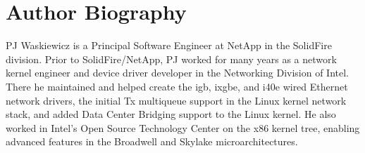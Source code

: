 \documentclass[letterpaper]{article}
\begin{document}
\section{Author Biography}
PJ Waskiewicz is a Principal Software Engineer at NetApp in the SolidFire division. Prior to SolidFire/NetApp, PJ worked for many years as a network kernel engineer and device driver developer in the Networking Division of Intel. There he maintained and helped create the igb, ixgbe, and i40e wired Ethernet network drivers, the initial Tx multiqueue support in the Linux kernel network stack, and added Data Center Bridging support to the Linux kernel. He also worked in Intel's Open Source Technology Center on the x86 kernel tree, enabling advanced features in the Broadwell and Skylake microarchitectures.
\end{document}
